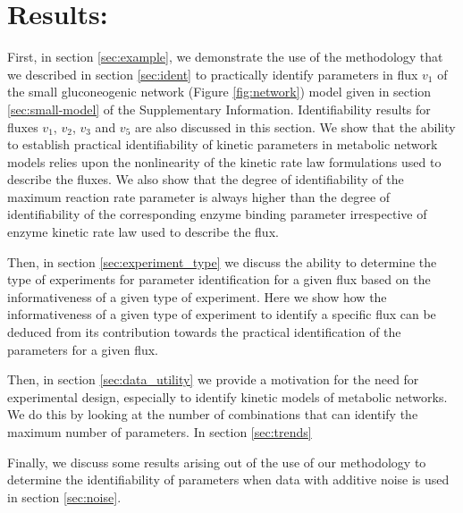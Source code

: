 \documentclass[10pt]{article}
\begin{document}
	\section{Results:}
	First, in section \ref{sec:example}, we demonstrate the use of the methodology that we described in section \ref{sec:ident} to practically identify parameters in flux $v_1$ of the small gluconeogenic network (Figure \ref{fig:network}) model given in section \ref{sec:small-model} of the Supplementary Information. Identifiability results for fluxes $v_1$, $v_2$, $v_3$ and $v_5$ are also discussed in this section. We show that the ability to establish practical identifiability of kinetic parameters in metabolic network models relies upon the nonlinearity of the kinetic rate law formulations used to describe the fluxes. We also show that the degree of identifiability of the maximum reaction rate parameter is always higher than the degree of identifiability of the corresponding enzyme binding parameter irrespective of enzyme kinetic rate law used to describe the flux. 
	
	Then, in section \ref{sec:experiment_type} we discuss the ability to determine the type of experiments for parameter identification for a given flux based on the informativeness of a given type of experiment. Here we show how the informativeness of a given type of experiment to identify a specific flux can be deduced from its contribution towards the practical identification of the parameters for a given flux. 
	
	
	Then, in section \ref{sec:data_utility} we provide a motivation for the need for experimental design, especially to identify kinetic models of metabolic networks. We do this by looking at the number of combinations that can identify the maximum number of parameters. 
	In section \ref{sec:trends} 
	
	Finally, we discuss some results arising out of the use of our methodology to determine the identifiability of parameters when data with additive noise is used in section \ref{sec:noise}.
	
\end{document}

